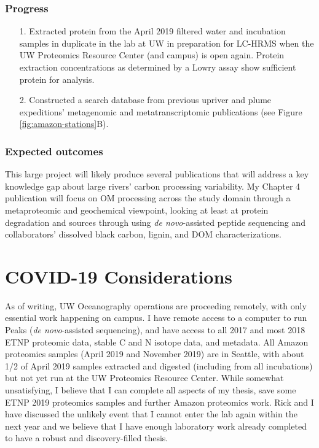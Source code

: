 \documentclass[12pt, letterpaper, twoside]{article}
\begin{document}
\subsubsection*{Progress}


\begin{enumerate}
	\item[1.] Extracted protein from the April 2019 filtered water and incubation samples in duplicate in the lab at UW in preparation for LC-HRMS when the UW Proteomics Resource Center (and campus) is open again. Protein extraction concentrations as determined by a Lowry assay show sufficient protein for analysis. 
	\item[2.] Constructed a search database from previous upriver and plume expeditions' metagenomic and metatranscriptomic publications \cite{satinsky_amazon_2014, doherty_bacterial_2017, satinsky_metagenomic_2015, ghai_metagenomics_2011}(see Figure \ref{fig:amazon-stations}B).
\end{enumerate}

\subsubsection*{Expected outcomes}

This large project will likely produce several publications that will address a key knowledge gap about large rivers' carbon processing variability. My Chapter 4 publication will focus on OM processing across the study domain through a metaproteomic and geochemical viewpoint, looking at least at protein degradation and sources through using \textit{de novo}-assisted peptide sequencing and collaborators' dissolved black carbon, lignin, and DOM characterizations.

\section{COVID-19 Considerations}

As of writing, UW Oceanography operations are proceeding remotely, with only essential work happening on campus. I have remote access to a computer to run Peaks (\textit{de novo}-assisted sequencing), and have access to all 2017 and most 2018 ETNP proteomic data, stable C and N isotope data, and metadata. All Amazon proteomics samples (April 2019 and November 2019) are in Seattle, with about 1/2 of April 2019 samples extracted and digested (including from all incubations) but not yet run at the UW Proteomics Resource Center. While somewhat unsatisfying, I believe that I can complete all aspects of my thesis, save some ETNP 2019 proteomics samples and further Amazon proteomics work. Rick and I have discussed the unlikely event that I cannot enter the lab again within the next year and we believe that I have enough laboratory work already completed to have a robust and discovery-filled thesis. 
\end{document}
